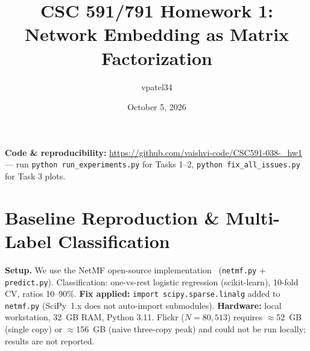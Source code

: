 \documentclass[10pt,letterpaper]{article}
\title{\vspace{-2em}\textbf{CSC 591/791 Homework 1: Network Embedding as Matrix Factorization}\vspace{-1em}}
\author{vpatel34}
\date{October 5, 2026}
\begin{document}
\maketitle\vspace{-1.5em}

\noindent\textbf{Code \& reproducibility:}
\url{https://github.com/vaishvi-code/CSC591-038-_hw1} ---
run \texttt{python run\_experiments.py} for Tasks 1--2, \texttt{python fix\_all\_issues.py} for Task 3 plots.

\section{Baseline Reproduction \& Multi-Label Classification}

\textbf{Setup.} We use the NetMF open-source implementation~\cite{netmf} (\texttt{netmf.py} + \texttt{predict.py}).
Classification: one-vs-rest logistic regression (scikit-learn), 10-fold CV, ratios 10--90\%.
\textbf{Fix applied:} \texttt{import scipy.sparse.linalg} added to \texttt{netmf.py} (SciPy~1.x does not auto-import submodules).
\textbf{Hardware:} local workstation, 32~GB RAM, Python 3.11.
Flickr ($N{=}80{,}513$) requires $\approx$52~GB (single copy) or $\approx$156~GB (naive three-copy peak)
and could not be run locally; results are not reported.
\end{document}
